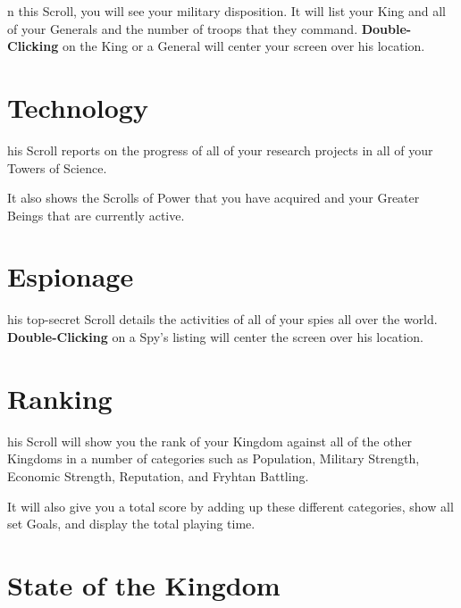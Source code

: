 
n this Scroll, you will see your military disposition. It will list your King and all of your Generals and the number of troops that they command. \textbf{Double-Clicking} on the King or a General will center your screen over his location.

\section{\textsf{Technology}}


his Scroll reports on the progress of all of your research projects in all of your Towers of Science.

It also shows the Scrolls of Power that you have acquired and your Greater Beings that are currently active.

\section{\textsf{Espionage}}



his top-secret Scroll details the activities of all of your spies all over the world. \textbf{Double-Clicking} on a Spy’s listing will center the screen over his location.

\section{\textsf{Ranking}}


his Scroll will show you the rank of your Kingdom against all of the other Kingdoms in a number of categories such as Population, Military Strength, Economic Strength, Reputation, and Fryhtan Battling.

It will also give you a total score by adding up these different categories, show all set Goals, and display the total playing time.

\section{\textsf{State of the Kingdom}}


